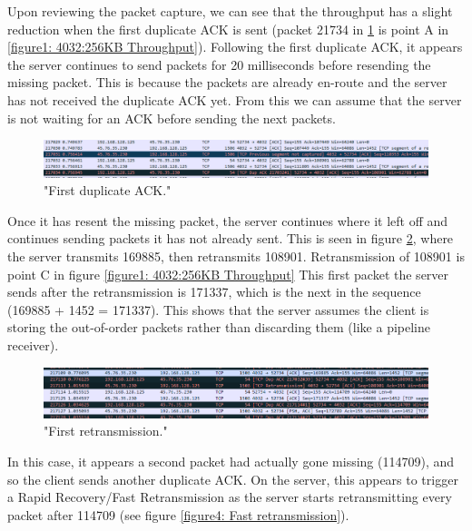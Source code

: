 \documentclass[12pt]{article}
\begin{document}
Upon reviewing the packet capture, we can see that the throughput has a slight reduction when the first duplicate ACK is sent (packet 21734 in \ref{figure2: first duplicate ACK} is point A in \ref{figure1: 4032:256KB Throughput}).
Following the first duplicate ACK, it appears the server continues to send packets for 20 milliseconds before resending the missing packet.
This is because the packets are already en-route and the server has not received the duplicate ACK yet. 
From this we can assume that the server is not waiting for an ACK before sending the next packets.

\begin{figure}[!htbp]
  \centering
  \includegraphics[width=\linewidth]{4032-256KB-duplicate-ack.PNG}
  \caption{"First duplicate ACK."}
  \label{figure2: first duplicate ACK}
\end{figure}

Once it has resent the missing packet, the server continues where it left off and continues sending packets it has not already sent.
This is seen in figure \ref{figure3: First retransmission}, where the server transmits 169885, then retransmits 108901.
Retransmission of 108901 is point C in figure \ref{figure1: 4032:256KB Throughput}
This first packet the server sends after the retransmission is 171337, which is the next in the sequence (169885 + 1452 = 171337).
This shows that the server assumes the client is storing the out-of-order packets rather than discarding them (like a pipeline receiver).

\begin{figure}[!htbp]
  \centering
  \includegraphics[width=\linewidth]{4032-256KB-retransmission.PNG}
  \caption{"First retransmission."}
  \label{figure3: First retransmission}
\end{figure}

In this case, it appears a second packet had actually gone missing (114709), and so the client sends another duplicate ACK.
On the server, this appears to trigger a Rapid Recovery/Fast Retransmission as the server starts retransmitting every packet after 114709 (see figure \ref{figure4: Fast retransmission}).
\end{document}
